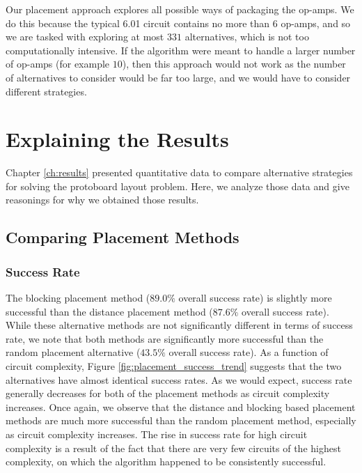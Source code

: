 Our placement approach explores all possible ways
of packaging the op-amps. We do this because the typical 6.01 circuit contains
no more than $6$ op-amps, and so we are tasked with exploring at most $331$
alternatives, which is not too computationally intensive. If the
algorithm were meant to handle a larger number of op-amps (for example $10$),
then
this approach would not work as the number of alternatives to consider would be
far too large, and we would have to consider different strategies.

\section{Explaining the Results}

Chapter \ref{ch:results} presented quantitative data to compare alternative
strategies for solving the protoboard layout problem. Here, we
analyze those data and give reasonings for why we obtained those results.

\subsection{Comparing Placement Methods}

\subsubsection{Success Rate}
The blocking placement method ($89.0\%$ overall success rate)
is slightly more successful than the distance placement method ($87.6\%$ overall
success rate). While these alternative methods are not significantly different
in terms of success rate, we note that both methods are significantly
more successful than the random placement alternative ($43.5\%$ overall success
rate).
As a function of circuit
complexity, Figure
\ref{fig:placement_success_trend} suggests that the two alternatives have almost
identical success rates. As we would expect, success rate generally decreases
for both of the placement methods as circuit complexity increases.
Once again, we observe that the distance and blocking based placement methods
are much more successful than the random placement method, especially as
circuit complexity increases.
The rise in success rate for high circuit complexity is a result of the fact
that there are very few circuits of the highest complexity, on which the
algorithm happened to be consistently successful.

